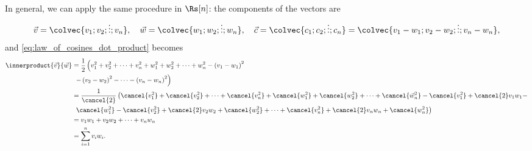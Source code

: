 In general, we can apply the same procedure in $\Rs[n]$: the components of the vectors are
\begin{equation}
	\vec{v} = \colvec{v_{1};v_{2};\vdots;v_{n}},\quad \vec{w} = \colvec{w_{1};w_{2};\vdots;w_{n}},\quad \vec{c} = \colvec{c_{1};c_{2};\vdots;c_{n}} = \colvec{v_{1}-w_{1};v_{2}-w_{2};\vdots;v_{n}-w_{n}},
	\label{eq:law_of_cosines_vector_components_3}
\end{equation}
and \autoref{eq:law_of_cosines_dot_product} becomes
\begin{equation}
	\begin{aligned}
		\innerproduct{\vec{v}}{\vec{w}} & = \frac{1}{2}\left(v_{1}^{2}+v_{2}^{2}+\dots+v_{n}^{2} + w_{1}^{2}+w_{2}^{2}+\dots+w_{n}^{2}-\left(v_{1}-w_{1}\right)^{2}\right.                                                                                      \\
		                                & \ \left.-\left(v_{2}-w_{2}\right)^{2}-\dots-\left(v_{n}-w_{n}\right)^{2}\right)                                                                                                                                       \\
		                                & = \frac{1}{\cancel{2}}\left(\cancel{v_{1}^{2}}+\cancel{v_{2}^{2}}+\dots+\cancel{v_{n}^{2}} + \cancel{w_{1}^{2}}+\cancel{w_{2}^{2}} + \dots + \cancel{\vec{w}_{n}^{2}}-\cancel{v_{1}^{2}}+\cancel{2}v_{1}w_{1}-\right. \\
		                                & \ \left.\cancel{w_{1}^{2}}-\cancel{v_{2}^{2}}+\cancel{2}v_{2}w_{2}+\cancel{w_{2}^{2}} + \dots + \cancel{v_{n}^{2}}+\cancel{2}v_{n}w_{n}+\cancel{w_{n}^{2}}\right)                                                     \\
		                                & = v_{1}w_{1} + v_{2}w_{2} + \dots + v_{n}{w_{n}}                                                                                                                                                                      \\
		                                & = \sum\limits_{i=1}^{n}v_{i}w_{i}.
	\end{aligned}
	\label{eq:law_of_cosines_vector_components_4}
\end{equation}

